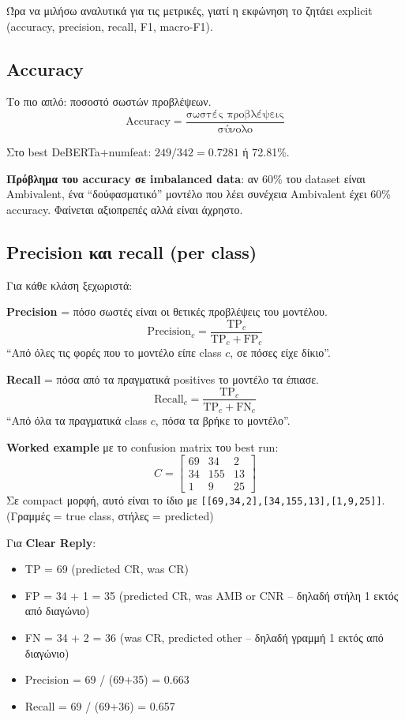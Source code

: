 \documentclass[12pt]{fphw}
\begin{document}
Ώρα να μιλήσω αναλυτικά για τις μετρικές, γιατί η εκφώνηση το ζητάει explicit (accuracy, precision, recall, F1, macro-F1).

\subsection{Accuracy}

Το πιο απλό: ποσοστό σωστών προβλέψεων.
\[
\text{Accuracy} = \frac{\text{σωστές προβλέψεις}}{\text{σύνολο}}
\]

Στο best DeBERTa+numfeat: $249 / 342 = 0.7281$ ή 72.81\%.

\textbf{Πρόβλημα του accuracy σε imbalanced data}: αν 60\% του dataset είναι Ambivalent, ένα ``δούφασματικό'' μοντέλο που λέει συνέχεια Ambivalent έχει 60\% accuracy. Φαίνεται αξιοπρεπές αλλά είναι άχρηστο.

\subsection{Precision και recall (per class)}

Για κάθε κλάση ξεχωριστά:

\textbf{Precision} = πόσο σωστές είναι οι θετικές προβλέψεις του μοντέλου.
\[
\text{Precision}_c = \frac{\text{TP}_c}{\text{TP}_c + \text{FP}_c}
\]
``Από όλες τις φορές που το μοντέλο είπε class $c$, σε πόσες είχε δίκιο''.

\textbf{Recall} = πόσα από τα πραγματικά positives το μοντέλο τα έπιασε.
\[
\text{Recall}_c = \frac{\text{TP}_c}{\text{TP}_c + \text{FN}_c}
\]
``Από όλα τα πραγματικά class $c$, πόσα τα βρήκε το μοντέλο''.

\textbf{Worked example} με το confusion matrix του best run:
\[
C = \begin{bmatrix}
69 & 34 & 2 \\
34 & 155 & 13 \\
1 & 9 & 25
\end{bmatrix}
\]
Σε compact μορφή, αυτό είναι το ίδιο με \texttt{[[69,34,2],[34,155,13],[1,9,25]]}.
(Γραμμές = true class, στήλες = predicted)

Για \textbf{Clear Reply}:
\begin{itemize}
    \item TP = 69 (predicted CR, was CR)
    \item FP = 34 + 1 = 35 (predicted CR, was AMB or CNR -- δηλαδή στήλη 1 εκτός από διαγώνιο)
    \item FN = 34 + 2 = 36 (was CR, predicted other -- δηλαδή γραμμή 1 εκτός από διαγώνιο)
    \item Precision = 69 / (69+35) = 0.663
    \item Recall = 69 / (69+36) = 0.657
\end{itemize}
\end{document}
